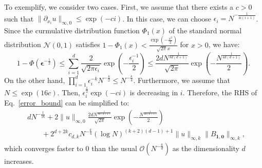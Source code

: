 To exemplify, we consider two cases. First, we assume that there exists a $c>0$ such that $\|\partial_{x_i}u\|_{\infty, 0}\leq \exp(-ci)$. In this case, we can choose $\epsilon_i = N^{-\frac{1}{4i(i+1)}}$. Since the curmulative distribution function $\Phi_1(x)$ of the standard normal distribution $\mathcal{N}(0, 1)$ satisfies $1-\Phi_1(x)<\frac{\exp(-\frac{x^2}{2})}{\sqrt{2\pi}x}$ for $x>0$, we have:
\begin{equation}
    1 - \Phi(\bm\epsilon^{-\frac{1}{2}})\leq \sum_{i=1}^d\frac{2}{\sqrt{2\pi\epsilon_i}}\exp(-\frac{\epsilon_i^{-1}}{2})\leq \frac{2dN^{\frac{1}{8d(d+1)}}}{\sqrt{2\pi}}\exp(-\frac{N^{\frac{1}{4d(d+1)}}}{2}).
\end{equation}
On the other hand, $\prod_{i=1}^d\epsilon_i^{-k}N^{-\frac{k}{2}}\leq N^{-\frac{k}{4}}$. Furthermore, we assume that $N\leq \exp(16c)$. Then, $\epsilon_i^{\frac{1}{2}}\exp(-ci)$ is decreasing in $i$. Therefore, the RHS of Eq.~\eqref{error_bound} can be simplified to:
\begin{equation}
\begin{aligned}
&dN^{-\frac{1}{16}} + 2\|u\|_{\infty, 0}\frac{2dN^{\frac{1}{8d(d+1)}}}{\sqrt{2\pi}}\exp(-\frac{N^{\frac{1}{4d(d+1)}}}{2}) \\
&\quad\quad+ 2^{d+2k}c_{d, k}N^{-\frac{k}{4}}(\log N)^{(k+2)(d-1)+1}\|u\|_{\infty, k}\|B_{\bm 1, \bm0}\|_{\infty, k},
\end{aligned}
\end{equation}
which converges faster to 0 than the usual $\mathcal{O}\!(N^{-\frac{k}{d}})$ as the dimensionality $d$ increases. 

